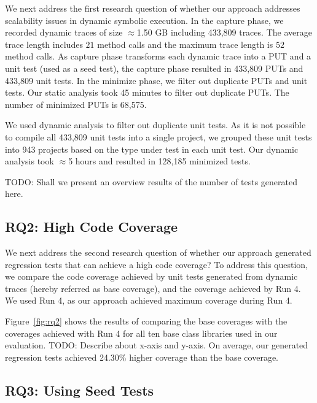 We next address the first research question of whether our approach addresses scalability
issues in dynamic symbolic execution. In the capture phase, we recorded dynamic traces
of size $\approx$1.50 GB including 433,809 traces. The average trace length includes
$21$ method calls and the maximum trace length is $52$ method calls.
As capture phase transforms each dynamic trace into a PUT and a unit test 
(used as a seed test), the capture phase resulted in 433,809
PUTs and 433,809 unit tests. In the minimize phase, we filter out duplicate 
PUTs and unit tests. Our static analysis took 45 minutes to filter out 
duplicate PUTs. The number of minimized PUTs is 68,575. 

We used dynamic analysis to filter out duplicate unit tests. As it is not possible
to compile all 433,809 unit tests into a single project, we grouped these unit tests
into 943 projects based on the type under test in each unit test. Our dynamic analysis
took $\approx$5 hours and resulted in 128,185 minimized tests.

TODO: Shall we present an overview results of the number of tests generated here.

\subsection{RQ2: High Code Coverage}

We next address the second research question of whether our approach generated 
regression tests that can achieve a high code coverage? To address this question,
we compare the code coverage achieved by unit tests generated from dynamic traces
(hereby referred as base coverage), and the coverage achieved by Run 4. We used
Run 4, as our approach achieved maximum coverage during Run 4.

Figure~\ref{fig:rq2} shows the results of comparing the base coverages with the coverages
achieved with Run 4 for all ten base class libraries used in our evaluation.
TODO: Describe about x-axis and y-axis. On average, our generated regression tests 
achieved 24.30\% higher coverage than the base coverage.

\subsection{RQ3: Using Seed Tests}

